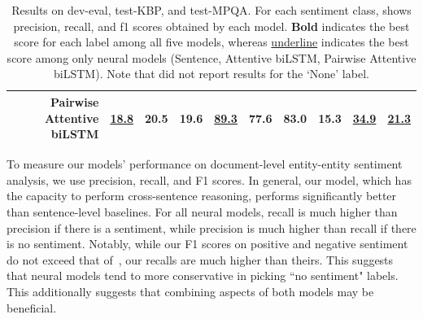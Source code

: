 \documentclass[11pt,a4paper]{article}
\begin{document}
\begin{table}[!t]
\begin{tabular}{| c | r | l | l | l | l | l | l | l | l | l |}
& Pairwise Attentive biLSTM	& \underline{18.8}	& 20.5	& 19.6	& \underline{89.3}	& 77.6	& 83.0	& 15.3	& \underline{\textbf{34.9}}	& \underline{21.3} \\ \hline
\end{tabular}
\caption{\label{tab:results-dev} Results on dev-eval, test-KBP, and test-MPQA. For each sentiment class, shows precision, recall, and f1 scores obtained by each model. \textbf{Bold} indicates the best score for each label among all five models, whereas \underline{underline} indicates the best score among only neural models (Sentence, Attentive biLSTM, Pairwise Attentive biLSTM). Note that  did not report results for the `None' label.}
\end{table}

To measure our models' performance on document-level entity-entity sentiment analysis, we use precision, recall, and F1 scores.
In general, our model, which has the capacity to perform cross-sentence reasoning, performs significantly better than sentence-level baselines.
For all neural models, recall is much higher than precision if there is a sentiment, while precision is much higher than recall if there is no sentiment. Notably, while our F1 scores on positive and negative sentiment do not exceed that of~, our recalls are much higher than theirs. This suggests that neural models tend to more conservative in picking ``no sentiment" labels. This additionally suggests that combining aspects of both models may be beneficial.
\end{document}
